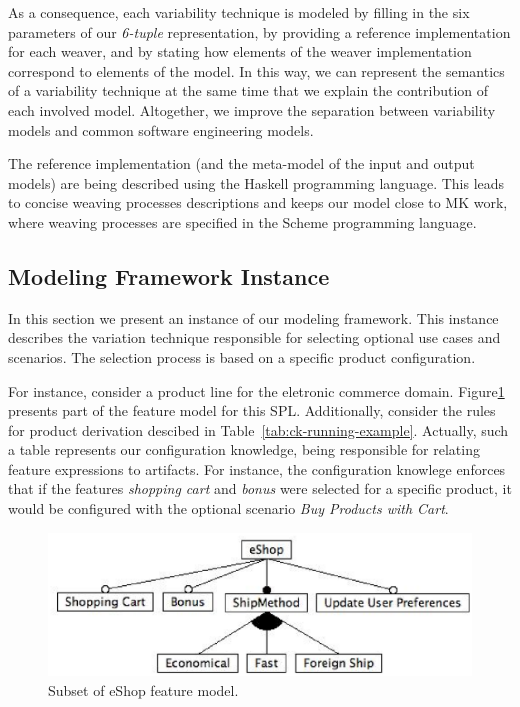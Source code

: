 \documentclass[times, 11pt,twocolumn]{article}
\begin{document}
As a consequence, each variability technique is modeled by filling in the six
parameters of our \emph{6-tuple} representation, by providing a reference
implementation for each weaver, and by stating how elements of the weaver 
implementation correspond to elements of the model. In this way, we can
represent the semantics of a variability technique at the same time that we
explain the contribution of each involved model. Altogether, we improve the
separation between variability models and common software engineering 
models. 

The reference implementation (and the meta-model of the input and
output models) are being described using the Haskell programming
language. This leads to concise weaving processes
descriptions and keeps our model close to MK work, where weaving processes are 
specified in the Scheme programming language. 



\subsection{Modeling Framework Instance}\label{sub:framework-instance}

In this section we present an instance of our modeling framework. This
instance describes the variation technique responsible for selecting optional
use cases and scenarios. The selection process is based on a specific product
configuration. 

For instance, consider a product line for the eletronic commerce domain.
Figure\ref{fig:eshop-fm-re} presents part of the feature model for this SPL.
Additionally, consider the rules for product derivation descibed in
Table~\ref{tab:ck-running-example}. Actually, such a table
represents our configuration knowledge, being responsible for relating feature
expressions to artifacts. For instance, the configuration knowlege enforces
that if the features \emph{shopping cart} and \emph{bonus} were selected for a
specific product, it would be configured with the optional scenario \emph{Buy
Products with Cart}. 

 \begin{figure}[h]
 \begin{center}
  \includegraphics[scale=0.40]{../images/eShop-fm-re.eps}
   \caption{Subset of eShop feature model.}
  \label{fig:eshop-fm-re}
  \end{center}
\end{figure}
\end{document}
